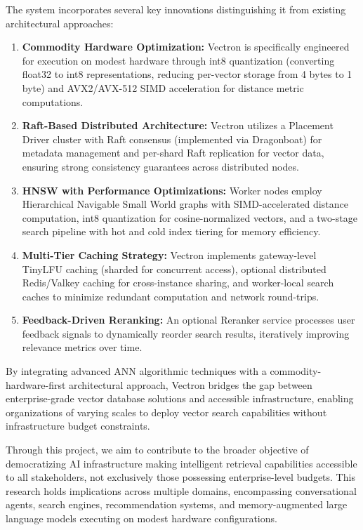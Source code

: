 The system incorporates several key innovations distinguishing it from existing architectural approaches:

\begin{enumerate}
    \item \textbf{Commodity Hardware Optimization:} Vectron is specifically engineered for execution on modest hardware through int8 quantization (converting float32 to int8 representations, reducing per-vector storage from 4 bytes to 1 byte) and AVX2/AVX-512 SIMD acceleration for distance metric computations.
    
    \item \textbf{Raft-Based Distributed Architecture:} Vectron utilizes a Placement Driver cluster with Raft consensus (implemented via Dragonboat) for metadata management and per-shard Raft replication for vector data, ensuring strong consistency guarantees across distributed nodes.
    
    \item \textbf{HNSW with Performance Optimizations:} Worker nodes employ Hierarchical Navigable Small World graphs with SIMD-accelerated distance computation, int8 quantization for cosine-normalized vectors, and a two-stage search pipeline with hot and cold index tiering for memory efficiency.
    
    \item \textbf{Multi-Tier Caching Strategy:} Vectron implements gateway-level TinyLFU caching (sharded for concurrent access), optional distributed Redis/Valkey caching for cross-instance sharing, and worker-local search caches to minimize redundant computation and network round-trips.
    
    \item \textbf{Feedback-Driven Reranking:} An optional Reranker service processes user feedback signals to dynamically reorder search results, iteratively improving relevance metrics over time.
\end{enumerate}

By integrating advanced ANN algorithmic techniques with a commodity-hardware-first architectural approach, Vectron bridges the gap between enterprise-grade vector database solutions and accessible infrastructure, enabling organizations of varying scales to deploy vector search capabilities without infrastructure budget constraints.

Through this project, we aim to contribute to the broader objective of democratizing AI infrastructure making intelligent retrieval capabilities accessible to all stakeholders, not exclusively those possessing enterprise-level budgets. This research holds implications across multiple domains, encompassing conversational agents, search engines, recommendation systems, and memory-augmented large language models executing on modest hardware configurations.



